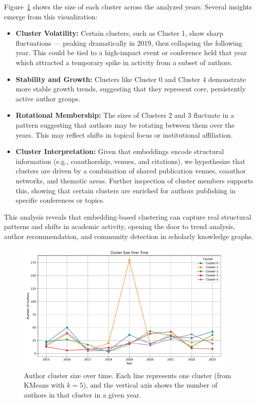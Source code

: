 \documentclass[10pt,a4paper]{article}
\begin{document}
Figure~\ref{fig:cluster_evolution} shows the size of each cluster across the analyzed years. Several insights emerge from this visualization:

\begin{itemize}
    \item \textbf{Cluster Volatility:} Certain clusters, such as Cluster 1, show sharp fluctuations — peaking dramatically in 2019, then collapsing the following year. This could be tied to a high-impact event or conference held that year which attracted a temporary spike in activity from a subset of authors.
    
    \item \textbf{Stability and Growth:} Clusters like Cluster 0 and Cluster 4 demonstrate more stable growth trends, suggesting that they represent core, persistently active author groups.

    \item \textbf{Rotational Membership:} The sizes of Clusters 2 and 3 fluctuate in a pattern suggesting that authors may be rotating between them over the years. This may reflect shifts in topical focus or institutional affiliation.

    \item \textbf{Cluster Interpretation:} Given that embeddings encode structural information (e.g., coauthorship, venues, and citations), we hypothesize that clusters are driven by a combination of shared publication venues, coauthor networks, and thematic areas. Further inspection of cluster members supports this, showing that certain clusters are enriched for authors publishing in specific conferences or topics.
\end{itemize}

This analysis reveals that embedding-based clustering can capture real structural patterns and shifts in academic activity, opening the door to trend analysis, author recommendation, and community detection in scholarly knowledge graphs.

\begin{figure}[H]
    \centering
    \includegraphics[width=0.95\textwidth]{img/cluster_distribution_over_time.pdf}
    \caption{Author cluster size over time. Each line represents one cluster (from KMeans with $k=5$), and the vertical axis shows the number of authors in that cluster in a given year.}
    \label{fig:cluster_evolution}
\end{figure}
\end{document}

